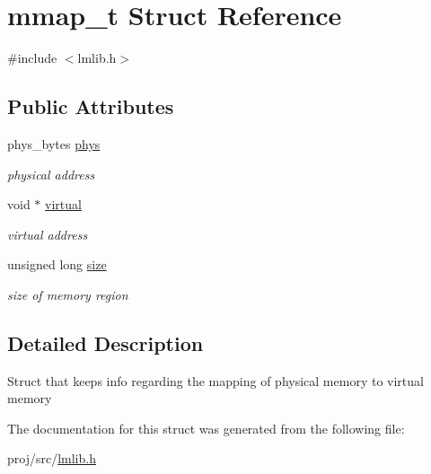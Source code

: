 \hypertarget{structmmap__t}{}\section{mmap\+\_\+t Struct Reference}
\label{structmmap__t}


{\ttfamily \#include $<$lmlib.\+h$>$}

\subsection*{Public Attributes}
\begin{DoxyCompactItemize}
\item 
phys\+\_\+bytes \hyperlink{group__lmlib_gaa6ac1ee0e0fadea4a4f85b48c8359ae4}{phys}
\begin{DoxyCompactList}\small\item\em physical address \end{DoxyCompactList}\item 
void $\ast$ \hyperlink{group__lmlib_ga4de93144fb3ffbceb9bd1f3009d6d98c}{virtual}
\begin{DoxyCompactList}\small\item\em virtual address \end{DoxyCompactList}\item 
unsigned long \hyperlink{group__lmlib_gaf1cdc5384a402fddf33f400a5e1e5e45}{size}
\begin{DoxyCompactList}\small\item\em size of memory region \end{DoxyCompactList}\end{DoxyCompactItemize}


\subsection{Detailed Description}
Struct that keeps info regarding the mapping of physical memory to virtual memory 

The documentation for this struct was generated from the following file\+:\begin{DoxyCompactItemize}
\item 
proj/src/\hyperlink{lmlib_8h}{lmlib.\+h}\end{DoxyCompactItemize}
